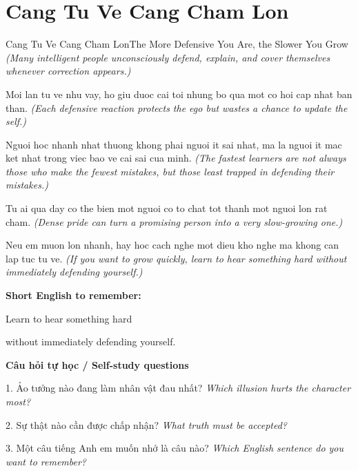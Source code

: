 \section{Cang Tu Ve Cang Cham Lon}
\begin{truyen}{Cang Tu Ve Cang Cham Lon}{The More Defensive You Are, the Slower You Grow}
\textit{(Many intelligent people unconsciously defend, explain, and cover themselves whenever correction appears.)}

Moi lan tu ve nhu vay, ho giu duoc cai toi nhung bo qua mot co hoi cap nhat ban than.
\textit{(Each defensive reaction protects the ego but wastes a chance to update the self.)}

Nguoi hoc nhanh nhat thuong khong phai nguoi it sai nhat, ma la nguoi it mac ket nhat trong viec bao ve cai sai cua minh.
\textit{(The fastest learners are not always those who make the fewest mistakes, but those least trapped in defending their mistakes.)}

Tu ai qua day co the bien mot nguoi co to chat tot thanh mot nguoi lon rat cham.
\textit{(Dense pride can turn a promising person into a very slow-growing one.)}

\end{truyen}

\begin{baihoc}
Neu em muon lon nhanh, hay hoc cach nghe mot dieu kho nghe ma khong can lap tuc tu ve.
\textit{(If you want to grow quickly, learn to hear something hard without immediately defending yourself.)}
\end{baihoc}

\begin{ghinhoanh}
\textbf{Short English to remember:}

Learn to hear something hard

without immediately defending yourself.

\end{ghinhoanh}

\begin{tuhocnhanh}
\textbf{Câu hỏi tự học / Self-study questions}

1. Ảo tưởng nào đang làm nhân vật đau nhất? \textit{Which illusion hurts the character most?}

2. Sự thật nào cần được chấp nhận? \textit{What truth must be accepted?}

3. Một câu tiếng Anh em muốn nhớ là câu nào? \textit{Which English sentence do you want to remember?}
\end{tuhocnhanh}
\ngancach

